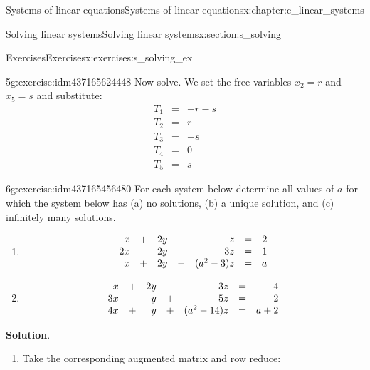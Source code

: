 \documentclass[oneside,10pt,]{book}
\makeatletter
\newcommand{\blocktitlefont}{\relax}
\numberwithin{equation}{section}
\newenvironment{linsys}[2][m]{
\begin{array}[#1]{@{}*{#2}{rc}r@{}}
}{
\end{array}}
\newcommand{\amp}{&}
\makeatother
\begin{document}
\begin{chapterptx}{Systems of linear equations}{}{Systems of linear equations}{}{}{x:chapter:c_linear_systems}
\begin{sectionptx}{Solving linear systems}{}{Solving linear systems}{}{}{x:section:s_solving}
\begin{exercises-subsection-numberless}{Exercises}{}{Exercises}{}{}{x:exercises:s_solving_ex}
\begin{exercisegroup}
\begin{divisionexerciseeg}{5}{}{}{g:exercise:idm437165624448}
Now solve. We set the free variables \(x_2=r\) and \(x_5 = s\) and substitute:%
\begin{align*}
T_1\amp =\amp -r-s\\
T_2\amp =\amp r\\
T_3\amp =\amp -s\\
T_4\amp =\amp 0\\
T_5\amp =\amp s
\end{align*}
%
\end{divisionexerciseeg}%
\end{exercisegroup}
\par\medskip\noindent
\begin{divisionexercise}{6}{}{}{g:exercise:idm437165456480}%
For each system below determine all values of \(a\) for which the system below has (a) no solutions, (b) a unique solution, and (c) infinitely many solutions.%
%
\begin{enumerate}[marker=(\alph*)]
\item{}%
\begin{equation*}
\begin{linsys}{3} x\amp +\amp 2y\amp +\amp z\amp =\amp 2\\ 2x\amp -\amp 2y\amp +\amp 3z\amp =\amp 1\\ x\amp +\amp 2y\amp -\amp (a^2-3)z\amp =\amp a \end{linsys}
\end{equation*}
%
\item{}%
\begin{equation*}
\begin{linsys}{3} x\amp +\amp 2y\amp -\amp 3z\amp =\amp 4\\ 3x\amp -\amp y\amp +\amp 5z\amp =\amp 2\\ 4x\amp +\amp y\amp +\amp (a^2-14)z\amp =\amp a+2 \end{linsys}
\end{equation*}
%
\end{enumerate}
\par\smallskip%
\noindent\textbf{\blocktitlefont Solution}.\hypertarget{g:solution:idm437165453280}{}\quad{}%
\begin{enumerate}[marker=(\alph*)]
\item{}Take the corresponding augmented matrix and row reduce:%
\begin{align*}

\end{align*}
\end{enumerate}
\end{divisionexercise}
\end{exercises-subsection-numberless}
\end{sectionptx}
\end{chapterptx}
\end{document}
